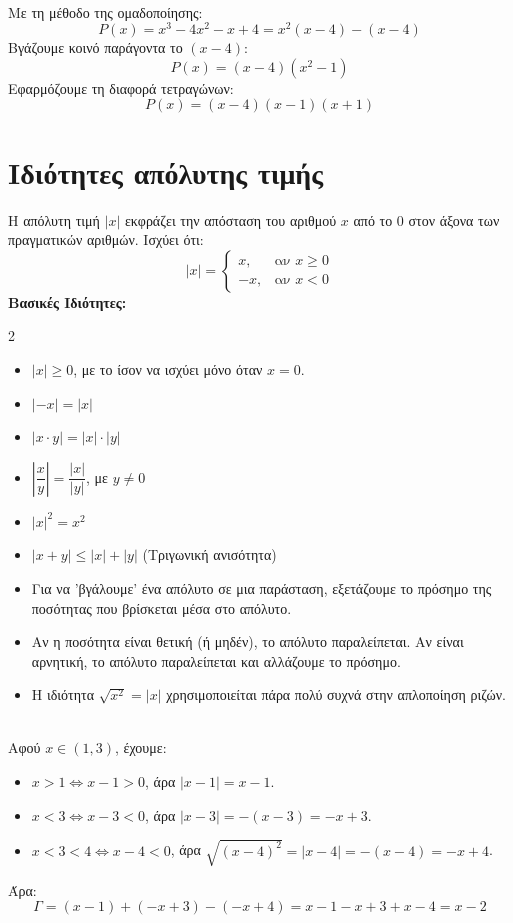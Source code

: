 \\
\lysh
Με τη μέθοδο της ομαδοποίησης:
\[ P(x) = x^3 - 4x^2 - x + 4 = x^2(x - 4) - (x - 4) \]
Βγάζουμε κοινό παράγοντα το $(x - 4)$:
\[ P(x) = (x - 4)(x^2 - 1) \]
Εφαρμόζουμε τη διαφορά τετραγώνων:
\[ P(x) = (x - 4)(x - 1)(x + 1) \]

\section{Ιδιότητες απόλυτης τιμής}

Η απόλυτη τιμή $|x|$ εκφράζει την απόσταση του αριθμού $x$ από το 0 στον άξονα των πραγματικών αριθμών. Ισχύει ότι:
\[ |x| = \begin{cases} x, & \text{αν } x \geq 0 \\ -x, & \text{αν } x < 0 \end{cases} \]
\textbf{Βασικές Ιδιότητες:}
\begin{multicols}{2}
\begin{itemize}[label=\faEdit]
    \item $|x| \geq 0$, με το ίσον να ισχύει μόνο όταν $x = 0$.
    \item $|-x| = |x|$
    \item $|x \cdot y| = |x| \cdot |y|$
    \item $\left| \dfrac{x}{y} \right| = \dfrac{|x|}{|y|}$, με $y \neq 0$
    \item $|x|^2 = x^2$
    \item $|x + y| \leq |x| + |y|$ (Τριγωνική ανισότητα)
\end{itemize}
\end{multicols}

\begin{itemize}
    \item Για να 'βγάλουμε' ένα απόλυτο σε μια παράσταση, εξετάζουμε το πρόσημο της ποσότητας που βρίσκεται μέσα στο απόλυτο.
    \item Αν η ποσότητα είναι θετική (ή μηδέν), το απόλυτο παραλείπεται. Αν είναι αρνητική, το απόλυτο παραλείπεται και αλλάζουμε το πρόσημο.
    \item Η ιδιότητα $\sqrt{x^2} = |x|$ χρησιμοποιείται πάρα πολύ συχνά στην απλοποίηση ριζών.
\end{itemize}


\\
\lysh
Αφού $x \in (1, 3)$, έχουμε:
\begin{itemize}
    \item $x > 1 \Leftrightarrow x - 1 > 0$, άρα $|x-1| = x-1$.
    \item $x < 3 \Leftrightarrow x - 3 < 0$, άρα $|x-3| = -(x-3) = -x+3$.
    \item $x < 3 < 4 \Leftrightarrow x - 4 < 0$, άρα $\sqrt{(x-4)^2} = |x-4| = -(x-4) = -x+4$.
\end{itemize}
Άρα:
\[ \Gamma = (x-1) + (-x+3) - (-x+4) = x - 1 - x + 3 + x - 4 = x - 2 \]

